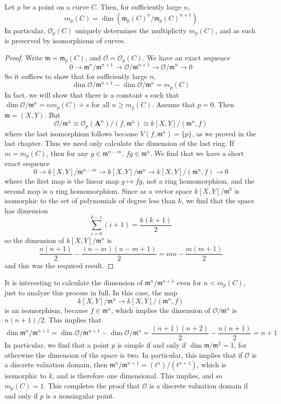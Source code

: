 \begin{prop}
    Let $p$ be a point on a curve $C$. Then, for sufficiently large $n$,
    \[ m_p(C) = \dim(\mathfrak{m}_p(C)^n/\mathfrak{m}_p(C)^{n+1}) \]
    In particular, $\mathcal{O}_p(C)$ uniquely determines the multiplicity $m_p(C)$, and as such is preserved by isomorphisms of curves.
\end{prop}
\begin{proof}
    Write $\mathfrak{m} = \mathfrak{m}_p(C)$, and $\mathcal{O} = \mathcal{O}_p(C)$. We have an exact sequence
    \[ 0 \to \mathfrak{m}^n/\mathfrak{m}^{n+1} \to \mathcal{O}/\mathfrak{m}^{n+1} \to \mathcal{O}/\mathfrak{m}^n \to 0 \]
    So it suffices to show that for sufficiently large $n$,
    \[ \dim \mathcal{O}/\mathfrak{m}^{n+1} - \dim \mathcal{O}/\mathfrak{m}^n = m_p(C) \]
    In fact, we will show that there is a constant $s$ such that $\dim \mathcal{O}/\mathfrak{m}^n = nm_p(C) + s$ for all $n \geq m_p(C)$. Assume that $p = 0$. Then $\mathfrak{m} = (X,Y)$. But
    \[ \mathcal{O}/\mathfrak{m}^n \cong \mathcal{O}_p(\mathbf{A}^n)/(f,\mathfrak{m}^n) \cong k[X,Y]/(\mathfrak{m}^n,f) \]
    where the last isomorphism follows because $V(f,\mathfrak{m}^n) = \{ p \}$, as we proved in the last chapter. Thus we need only calculate the dimension of the last ring. If $m = m_p(C)$, then for any $g \in \mathfrak{m}^{n-m}$, $fg \in \mathfrak{m}^n$. We find that we have a short exact sequence
    \[ 0 \to k[X,Y]/\mathfrak{m}^{n-m} \to k[X,Y]/\mathfrak{m}^n \to k[X,Y]/(\mathfrak{m}^n,f) \to 0 \]
    where the first map is the linear map $g \mapsto fg$, not a ring homomorphism, and the second map is a ring homomorphism. Since as a vector space $k[X,Y]/\mathfrak{m}^k$ is isomorphic to the set of polynomials of degree less than $k$, we find that the space has dimension
    \[ \sum_{i = 0}^{k-1} (i+1) = \frac{k(k+1)}{2} \]
    so the dimension of $k[X,Y]/\mathfrak{m}^n$ is
    \[ \frac{n(n+1)}{2} - \frac{(n-m)(n-m+1)}{2} = mn - \frac{m(m+1)}{2} \]
    and this was the required result.
\end{proof}

It is interesting to calculate the dimension of $\mathfrak{m}^n/\mathfrak{m}^{n+1}$ even for $n < m_p(C)$, just to analyze this process in full. In this case, the map
%
\[ k[X,Y]/\mathfrak{m}^n \to k[X,Y]/(\mathfrak{m}^n,f) \]
%
is an isomorphism, because $f \in \mathfrak{m}^n$, which implies the dimension of $\mathcal{O}/\mathfrak{m}^n$ is $n(n+1)/2$. This implies that
%
\[ \dim \mathfrak{m}^n/\mathfrak{m}^{n+1} = \dim \mathcal{O}/\mathfrak{m}^{n+1} - \dim \mathcal{O}/\mathfrak{m}^n = \frac{(n+1)(n+2)}{2} - \frac{n(n+1)}{2} = n + 1 \]
%
In particular, we find that a point $p$ is simple if and only if $\dim \mathfrak{m}/\mathfrak{m}^2 = 1$, for otherwise the dimension of the space is two. In particular, this implies that if $\mathcal{O}$ is a discrete valuation domain, then $\mathfrak{m}^n/\mathfrak{m}^{n+1} = (t^n)/(t^{n+1})$, which is isomorphic to $k$, and is therefore one dimensional. This implies, and so $m_p(C) = 1$. This completes the proof that $\mathcal{O}$ is a discrete valuation domain if and only if $p$ is a nonsingular point.

